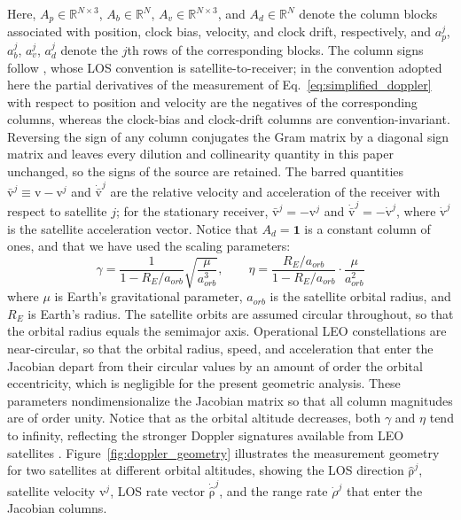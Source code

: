 \documentclass[letterpaper,times]{IONconf-v2}
\theoremstyle{plain}
\theoremstyle{remark}
\newcommand{\ones}{\mathbf{1}}
\renewcommand{\vec}[1]{{\boldsymbol{\mathrm{#1}}}}
\begin{document}
Here, $A_p \in \mathbb{R}^{N\times 3}$, $A_b \in \mathbb{R}^{N}$, $A_v \in \mathbb{R}^{N \times 3}$, and $A_d \in \mathbb{R}^{N}$ denote the column blocks associated with position, clock bias, velocity, and clock drift, respectively, and $a_p^j$, $a_b^j$, $a_v^j$, $a_d^j$ denote the $j$th rows of the corresponding blocks. The column signs follow \textcite{Psiaki2021}, whose LOS convention is satellite-to-receiver; in the convention adopted here the partial derivatives of the measurement of Eq.~\eqref{eq:simplified_doppler} with respect to position and velocity are the negatives of the corresponding columns, whereas the clock-bias and clock-drift columns are convention-invariant. Reversing the sign of any column conjugates the Gram matrix by a diagonal sign matrix and leaves every dilution and collinearity quantity in this paper unchanged, so the signs of the source are retained. The barred quantities $\bar{\vec{v}}^j \equiv \vec{v} - \vec{v}^j$ and $\dot{\bar{\vec{v}}}^j$ are the relative velocity and acceleration of the receiver with respect to satellite $j$; for the stationary receiver, $\bar{\vec{v}}^j = -\vec{v}^j$ and $\dot{\bar{\vec{v}}}^j = -\dot{\vec{v}}^j$, where $\dot{\vec{v}}^j$ is the satellite acceleration vector. Notice that $A_d = \ones$ is a constant column of ones, and that we have used the scaling parameters:
%
\begin{equation}\label{eq:gamma_eta}
\gamma = \frac{1}{1 - R_E/a_{orb}} \sqrt{\frac{\mu}{a_{orb}^3}}, \qquad
\eta = \frac{R_E/a_{orb}}{1 - R_E/a_{orb}} \cdot \frac{\mu}{a_{orb}^2}
\end{equation}
%
where $\mu$ is Earth's gravitational parameter, $a_{orb}$ is the satellite orbital radius, and $R_E$ is Earth's radius. The satellite orbits are assumed circular throughout, so that the orbital radius equals the semimajor axis. Operational LEO constellations are near-circular, so that the orbital radius, speed, and acceleration that enter the Jacobian depart from their circular values by an amount of order the orbital eccentricity, which is negligible for the present geometric analysis. These parameters nondimensionalize the Jacobian matrix so that all column magnitudes are of order unity. Notice that as the orbital altitude decreases, both $\gamma$ and $\eta$ tend to infinity, reflecting the stronger Doppler signatures available from LEO satellites \parencite{Psiaki2021}. Figure~\ref{fig:doppler_geometry} illustrates the measurement geometry for two satellites at different orbital altitudes, showing the LOS direction $\hat{\vec\rho}^j$, satellite velocity $\vec{v}^j$, LOS rate vector $\dot{\hat{\vec\rho}}^j$, and the range rate $\dot{\rho}^j$ that enter the Jacobian columns.
\end{document}
